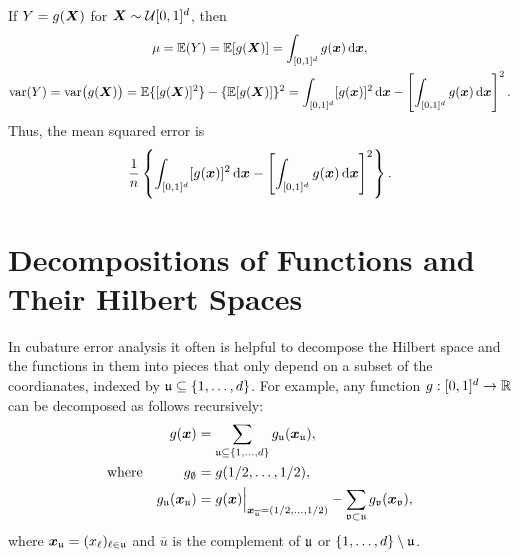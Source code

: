 \documentclass[letterpaper]{amsart}
\newcommand{\fv}{\mathfrak{v}}
\begin{document}
If $Y = g(\boldsymbol{X})$ for $\boldsymbol{X} \sim \mathcal{U}[0,1]^d$, then
\begin{gather*}
    \mu = \operatorname{\mathbb{E}}(Y) = \operatorname{\mathbb{E}}[g(\boldsymbol{X})]  = \int_{[0,1]^d} g(\boldsymbol{x}) \, {\rm d} \boldsymbol{x}, \\
    \operatorname{var}(Y) = \operatorname{var}\bigl(g(\boldsymbol{X})\bigr) = \operatorname{\mathbb{E}}\{[g(\boldsymbol{X})]^2\} - \{\operatorname{\mathbb{E}}[g(\boldsymbol{X})]\}^2 = \int_{[0,1]^d} [g(\boldsymbol{x})]^2  \, {\rm d} \boldsymbol{x} -
    \left[\int_{[0,1]^d} g(\boldsymbol{x}) \, {\rm d} \boldsymbol{x}\right]^2.
\end{gather*}
Thus, the mean squared error is
\[
\frac 1n  \left\{\int_{[0,1]^d} [g(\boldsymbol{x})]^2  \, {\rm d} \boldsymbol{x} -
    \left[\int_{[0,1]^d} g(\boldsymbol{x}) \, {\rm d} \boldsymbol{x}\right]^2 \right\}.
\]

\section{Decompositions of Functions and Their Hilbert Spaces} \label{sec:decomp}
In cubature error analysis it often is helpful to decompose the Hilbert space and the functions in them into pieces that only depend on a subset of the coordianates, indexed by $\mathfrak{u} \subseteq \{1, \ldots, d\}$.  For example, any function $g:[0,1]^d \to \mathbb{R}$ can be decomposed as follows recursively:
\begin{align*}
	&& g(\vx) & = \sum_{\fu \subseteq \{1, \ldots, d\}} g_\fu(\vx_\fu), \\
	&\text{where}& g_\emptyset &= g(1/2, \ldots, 1/2), \\
	&&g_{\fu}(\vx_\fu) &= g(\vx) \Bigr |_{\vx_{\overline{\fu}} = (1/2, \ldots, 1/2)} - \sum_{\fv \subset \fu} g_{\fv}(\vx_\fv),
\end{align*}
where $\boldsymbol{x}_{\mathfrak{u}} = (x_\ell)_{\ell \in \mathfrak{u}}$ and $\overline{u}$ is the complement of $\mathfrak{u}$ or $\{1, \ldots, d\} \setminus \mathfrak{u}$.
\end{document}
